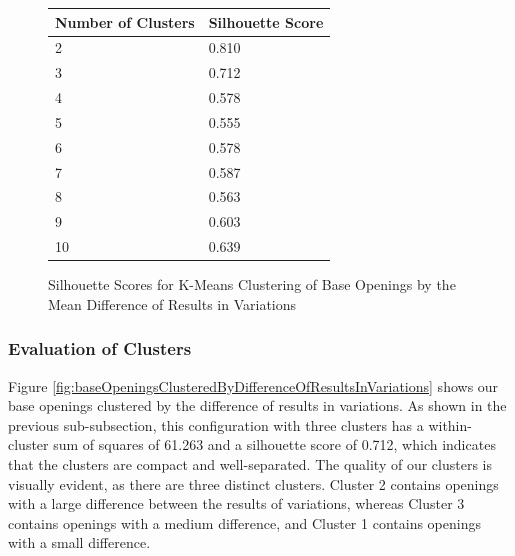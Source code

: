 \documentclass[a4paper, 11pt]{article}
\begin{document}
\begin{figure}[H]
    \centering
    \caption{Silhouette Scores for K-Means Clustering of Base Openings by the Mean Difference of Results in Variations}
    \label{fig:silhouetteScoresForBaseOpeningsClusteredByDifferenceInVariations}
    \begin{tabular}{| l | l |} 
        \hline
        \bf{Number of Clusters} & \bf{Silhouette Score} \\ [0.5ex] 
        \hline
        2 & 0.810 \\
        \hline
        3 & 0.712 \\
        \hline
        4 & 0.578 \\
        \hline
        5 & 0.555 \\
        \hline
        6 & 0.578 \\
        \hline
        7 & 0.587 \\
        \hline
        8 & 0.563 \\
        \hline
        9 & 0.603 \\
        \hline
        10 & 0.639 \\
        \hline
    \end{tabular}
\end{figure}

\subsubsection{Evaluation of Clusters}
Figure \ref{fig:baseOpeningsClusteredByDifferenceOfResultsInVariations} shows our base openings clustered by the difference of results in variations. As shown in the previous sub-subsection, this configuration with three clusters has a within-cluster sum of squares of 61.263 and a silhouette score of 0.712, which indicates that the clusters are compact and well-separated. The quality of our clusters is visually evident, as there are three distinct clusters. Cluster 2 contains openings with a large difference between the results of variations, whereas Cluster 3 contains openings with a medium difference, and Cluster 1 contains openings with a small difference.
\end{document}
